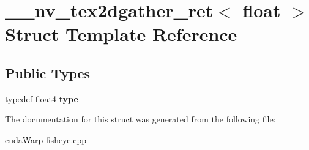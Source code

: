 \hypertarget{struct____nv__tex2dgather__ret_3_01float_01_4}{}\section{\+\_\+\+\_\+nv\+\_\+tex2dgather\+\_\+ret$<$ float $>$ Struct Template Reference}
\label{struct____nv__tex2dgather__ret_3_01float_01_4}
\subsection*{Public Types}
\begin{DoxyCompactItemize}
\item 
typedef float4 {\bfseries type}\hypertarget{struct____nv__tex2dgather__ret_3_01float_01_4_a641242e5eb438ebc375fd1ee97433988}{}\label{struct____nv__tex2dgather__ret_3_01float_01_4_a641242e5eb438ebc375fd1ee97433988}

\end{DoxyCompactItemize}


The documentation for this struct was generated from the following file\+:\begin{DoxyCompactItemize}
\item 
cuda\+Warp-\/fisheye.\+cpp\end{DoxyCompactItemize}

